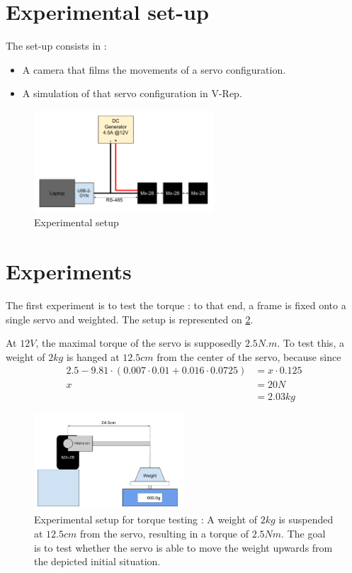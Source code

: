 \section{Experimental set-up}
The set-up consists in :
\begin{itemize}
\item A camera that films the movements of a servo configuration.
\item A simulation of that servo configuration in V-Rep.
\end{itemize}

\begin{figure}[htp]
\center
\includegraphics[width=0.6\textwidth]{figures/exp_setup}
\caption{Experimental setup}
\label{fig:exp_setup}
\end{figure}

\section{Experiments}
The first experiment is to test the torque : to that end, a frame is fixed onto a single servo and weighted. The setup is represented on \cref{fig:exp1}.

At $12V$, the maximal torque\cite{mx_28_manual} of the servo is supposedly $2.5N.m$. To test this, a weight of $2kg$ is hanged at $12.5cm$ from the center of the servo, because since 
\begin{align*}
2.5 - 9.81 \cdot (0.007 \cdot 0.01 + 0.016 \cdot 0.0725) &= x \cdot 0.125\\
x &= 20 N\\
&= 2.03 kg
\end{align*}

\begin{figure}[htp]
\center
    \includegraphics[width = 0.5\textwidth]{figures/exp1}
    \caption[Experimental setup for torque testing]{Experimental setup for torque testing : A weight of $2kg$ is suspended at $12.5cm$ from the servo, resulting in a torque of $2.5Nm$. The goal is to test whether the servo is able to move the weight upwards from the depicted initial situation.}
    \label{fig:exp1}
\end{figure}

